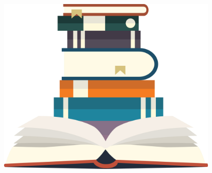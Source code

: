 \begin{frame}
\begin{columns}
        \begin{column}{0.3\textwidth}
            \begin{figure}[!ht]
                \includegraphics[width=0.95\textwidth]{figures/introduction/definition.jpg}
            \end{figure}
        \end{column}
    \end{columns}

\end{frame}

